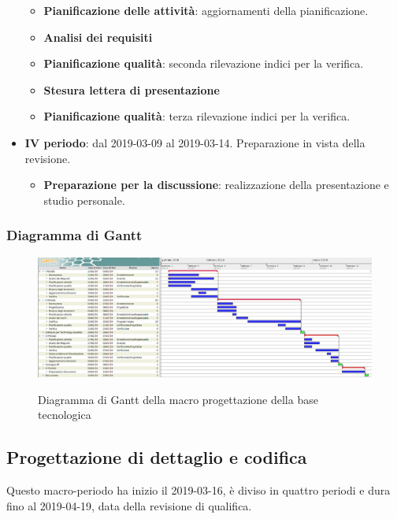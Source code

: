 \begin{itemize}
			\begin{itemize}
				\item \textbf{Pianificazione delle attività}: aggiornamenti della pianificazione.
				\item \textbf{Analisi dei requisiti}
				\item \textbf{Pianificazione qualità}: seconda rilevazione indici per la verifica.
				\item \textbf{Stesura lettera di presentazione}
				\item \textbf{Pianificazione qualità}: terza rilevazione indici per la verifica.
        	\end{itemize}
        	\item \textbf{IV periodo}: dal 2019-03-09 al 2019-03-14. Preparazione in vista della revisione.
        	\begin{itemize}
        		\item \textbf{Preparazione per la discussione}: realizzazione della presentazione e studio personale.
        	\end{itemize}
		\end{itemize}

        \begin{landscape}
			\subsubsection{Diagramma di Gantt}
			\begin{figure}[H]
					\centering
					\includegraphics[scale=0.375]{img/Progettazione_della_base_tecnologica.png}\\
					\caption{Diagramma di Gantt della macro progettazione della base tecnologica}
			\end{figure}
		\end{landscape}
		\newpage

        \subsection{Progettazione di dettaglio e codifica}\label{PianificazioneDettaglio}
		Questo macro-periodo ha inizio il 2019-03-16, è diviso in quattro periodi e dura fino al 2019-04-19,
		data della revisione di qualifica.

